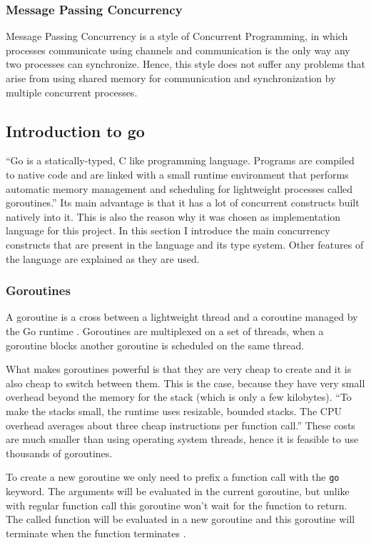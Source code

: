 \documentclass[12pt,a4paper]{article}
\begin{document}
\subsubsection{Message Passing Concurrency}
Message Passing Concurrency is a style of Concurrent Programming, in which
processes communicate using channels and communication is the only way
any two processes can synchronize. Hence, this style does not 
suffer any problems that arise from using shared memory for communication 
and synchronization by multiple concurrent processes.


\subsection{Introduction to go}
``Go is a statically-typed, C like programming language. Programs are compiled 
to native code and are linked with a small runtime environment that performs 
automatic memory management and scheduling for lightweight processes called 
goroutines.'' \cite[2]{whitehead} Its main advantage is 
that it has a lot of concurrent constructs built natively into it.
This is also the reason why it was chosen as implementation language 
for this project.
In this section I introduce the main concurrency constructs that are
present in the language and its type system. Other features
of the language are explained as they are used.

\subsubsection{Goroutines}
A goroutine is a cross between a lightweight thread and a coroutine
managed by the Go runtime \cite{whitehead}. Goroutines are multiplexed
on a set of threads, when a goroutine blocks another goroutine is scheduled
on the same thread. 

What makes goroutines powerful is that they are very cheap to create and 
it is also cheap to switch between them. This is the case, because they 
have very small overhead beyond the memory for the stack (which is only 
a few kilobytes). ``To make the stacks small, the runtime uses resizable, 
bounded stacks. The CPU overhead averages about three cheap 
instructions per function call.'' \cite{FAQ} These costs are much smaller
than using operating system threads, hence it is feasible to use thousands
of goroutines.

To create a new goroutine we only need to prefix a function call with
the \texttt{go} keyword. The arguments will be evaluated in the current
goroutine, but unlike with regular function call this goroutine won't
wait for the function to return. The called 
function will be evaluated in a new goroutine and this goroutine will 
terminate when the function terminates \cite{GoDocumentation}.
\end{document}
